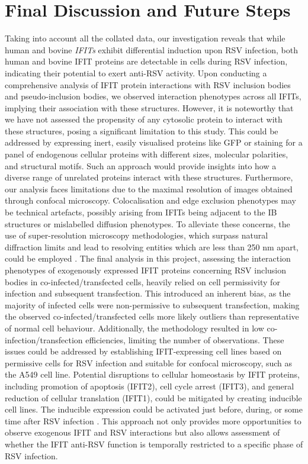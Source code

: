 \chapter{Final Discussion and Future Steps} \label{ch:Final Discussion and Future Steps}
Taking into account all the collated data, our investigation reveals that while human and bovine \textit{IFITs} exhibit differential induction upon RSV infection, both human and bovine IFIT proteins are detectable in cells during RSV infection, indicating their potential to exert anti-RSV activity. Upon conducting a comprehensive analysis of IFIT protein interactions with RSV inclusion bodies and pseudo-inclusion bodies, we observed interaction phenotypes across all IFITs, implying their association with these structures. However, it is noteworthy that we have not assessed the propensity of any cytosolic protein to interact with these structures, posing a significant limitation to this study. This could be addressed by expressing inert, easily visualised proteins like GFP or staining for a panel of endogenous cellular proteins with different sizes, molecular polarities, and structural motifs. Such an approach would provide insights into how a diverse range of unrelated proteins interact with these structures. Furthermore, our analysis faces limitations due to the maximal resolution of images obtained through confocal microscopy. Colocalisation and edge exclusion phenotypes may be technical artefacts, possibly arising from IFITs being adjacent to the IB structures or mislabelled diffusion phenotypes. To alleviate these concerns, the use of super-resolution microscopy methodologies, which surpass natural diffraction limits and lead to resolving entities which are less than 250 nm apart, could be employed \cite{Schermelleh2019Super-resolutionDemystified}. The final analysis in this project, assessing the interaction phenotypes of exogenously expressed IFIT proteins concerning RSV inclusion bodies in co-infected/transfected cells, heavily relied on cell permissivity for infection and subsequent transfection. This introduced an inherent bias, as the majority of infected cells were non-permissive to subsequent transfection, making the observed co-infected/transfected cells more likely outliers than representative of normal cell behaviour. Additionally, the methodology resulted in low co-infection/transfection efficiencies, limiting the number of observations. These issues could be addressed by establishing IFIT-expressing cell lines based on permissive cells for RSV infection and suitable for confocal microscopy, such as the A549 cell line. Potential disruptions to cellular homeostasis by IFIT proteins, including promotion of apoptosis (IFIT2), cell cycle arrest (IFIT3), and general reduction of cellular translation (IFIT1), could be mitigated by creating inducible cell lines. The inducible expression could be activated just before, during, or some time after RSV infection \cite{Kallunki2019HowStudies}. This approach not only provides more opportunities to observe exogenous IFIT and RSV interactions but also allows assessment of whether the IFIT anti-RSV function is temporally restricted to a specific phase of RSV infection.


